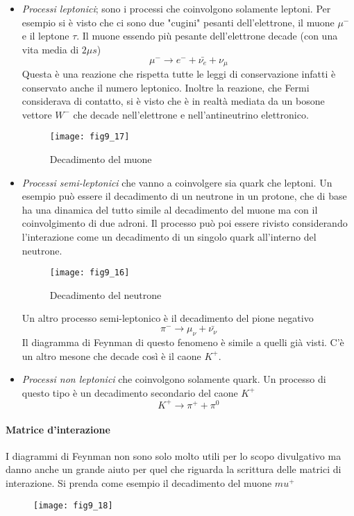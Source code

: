 \begin{itemize}
\item \emph{Processi leptonici}; sono i processi che coinvolgono solamente leptoni.
Per esempio si è visto che ci sono due "cugini" pesanti dell'elettrone, il muone $\mu^-$ e il leptone $\tau$.
Il muone essendo più pesante dell'elettrone decade (con una vita media di $2\mu s$)
\begin{equation}
\mu^-\to e^-+\bar{\nu_e}+\nu_\mu
\end{equation}
Questa è una reazione che rispetta tutte le leggi di conservazione infatti è conservato anche il numero leptonico.
Inoltre la reazione, che Fermi considerava di contatto, si è visto che è in realtà mediata da un bosone vettore $W^-$ che decade nell'elettrone e nell'antineutrino elettronico.
\begin{figure}[h]
\centering
\texttt{[image: fig9\_17]}
\caption{Decadimento del muone}
\end{figure}

\item \emph{Processi semi-leptonici} che vanno a coinvolgere sia quark che leptoni.
Un esempio può essere il decadimento di un neutrone in un protone, che di base ha una dinamica del tutto simile al decadimento del muone ma con il coinvolgimento di due adroni.
Il processo può poi essere rivisto considerando l'interazione come un decadimento di un singolo quark all'interno del neutrone.
\begin{figure}[h]
\centering
\texttt{[image: fig9\_16]}
\caption{Decadimento del neutrone}
\end{figure}
Un altro processo semi-leptonico è il decadimento del pione negativo
\begin{equation}
\pi^-\to \mu_\nu+\bar{\nu_\nu}
\end{equation} 
Il diagramma di Feynman di questo fenomeno è simile a quelli già visti.
C'è un altro mesone che decade così è il caone $K^+$.

\item \emph{Processi non leptonici} che coinvolgono solamente quark.
Un processo di questo tipo è un decadimento secondario del caone $K^+$
\begin{equation}
K^+\to \pi^++\pi^0
\end{equation}
\end{itemize}

\paragraph{Matrice d'interazione}
I diagrammi di Feynman non sono solo molto utili per lo scopo divulgativo ma danno anche un grande aiuto per quel che riguarda la scrittura delle matrici di interazione.
Si prenda come esempio il decadimento del muone $mu^+$
\begin{figure}[h]
\centering
\texttt{[image: fig9\_18]}
\end{figure}


